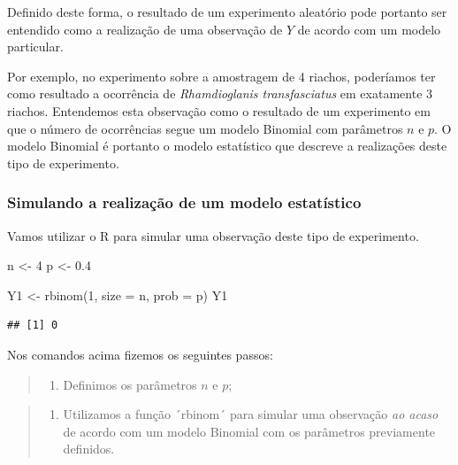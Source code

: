 \documentclass[
]{book}
\newenvironment{Shaded}{\begin{snugshade}}{\end{snugshade}}
\newcommand{\AttributeTok}[1]{\textcolor[rgb]{0.77,0.63,0.00}{#1}}
\newcommand{\DecValTok}[1]{\textcolor[rgb]{0.00,0.00,0.81}{#1}}
\newcommand{\FloatTok}[1]{\textcolor[rgb]{0.00,0.00,0.81}{#1}}
\newcommand{\FunctionTok}[1]{\textcolor[rgb]{0.00,0.00,0.00}{#1}}
\newcommand{\NormalTok}[1]{#1}
\newcommand{\OtherTok}[1]{\textcolor[rgb]{0.56,0.35,0.01}{#1}}
\providecommand{\tightlist}{%
  \setlength{\itemsep}{0pt}\setlength{\parskip}{0pt}}
\begin{document}
Definido deste forma, o resultado de um experimento aleatório pode portanto ser entendido como a realização de uma observação de \(Y\) de acordo com um modelo particular.

Por exemplo, no experimento sobre a amostragem de 4 riachos, poderíamos ter como resultado a ocorrência de \emph{Rhamdioglanis transfasciatus} em exatamente \(3\) riachos. Entendemos esta observação como o resultado de um experimento em que o número de ocorrências segue um modelo Binomial com parâmetros \(n\) e \(p\). O modelo Binomial é portanto o modelo estatístico que descreve a realizações deste tipo de experimento.

\hypertarget{simulando-a-realizauxe7uxe3o-de-um-modelo-estatuxedstico}{%
\subsubsection*{Simulando a realização de um modelo estatístico}\label{simulando-a-realizauxe7uxe3o-de-um-modelo-estatuxedstico}}

Vamos utilizar o R para simular uma observação deste tipo de experimento.

\begin{Shaded}
\begin{Highlighting}[]
\NormalTok{n }\OtherTok{\textless{}{-}} \DecValTok{4}
\NormalTok{p }\OtherTok{\textless{}{-}} \FloatTok{0.4}

\NormalTok{Y1 }\OtherTok{\textless{}{-}} \FunctionTok{rbinom}\NormalTok{(}\DecValTok{1}\NormalTok{, }\AttributeTok{size =}\NormalTok{ n, }\AttributeTok{prob =}\NormalTok{ p)}
\NormalTok{Y1}
\end{Highlighting}
\end{Shaded}

\begin{verbatim}
## [1] 0
\end{verbatim}

Nos comandos acima fizemos os seguintes passos:

\begin{quote}
\begin{enumerate}
\def\labelenumi{\arabic{enumi}.}
\tightlist
\item
  Definimos os parâmetros \(n\) e \(p\);
\end{enumerate}
\end{quote}

\begin{quote}
\begin{enumerate}
\def\labelenumi{\arabic{enumi}.}
\setcounter{enumi}{1}
\tightlist
\item
  Utilizamos a função ´rbinom´ para simular uma observação \emph{ao acaso} de acordo com um modelo Binomial com os parâmetros previamente definidos.
\end{enumerate}
\end{quote}
\end{document}
